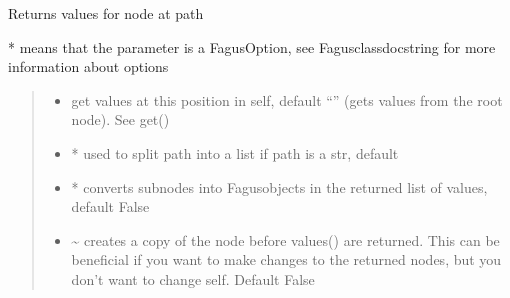 \documentclass[a4paper,10pt,english]{sphinxmanual}
\begin{document}
\begin{fulllineitems}
\begin{fulllineitems}
\begin{quote}
\begin{description}
\end{description}\end{quote}

\end{fulllineitems}


\begin{fulllineitems}
\label{\detokenize{fagus:fagus.Fagus.values}}
\pysigstartsignatures
{}
\pysigstopsignatures
\sphinxAtStartPar
Returns values for node at path

\sphinxAtStartPar
* means that the parameter is a FagusOption, see Fagus\sphinxhyphen{}class\sphinxhyphen{}docstring for more information about options
\begin{quote}\begin{description}
\begin{itemize}
\item {}
\sphinxAtStartPar
{} \textendash{} get values at this position in self, default “” (gets values from the root node). See get()

\item {}
\sphinxAtStartPar
{} \textendash{} * used to split path into a list if path is a str, default 

\item {}
\sphinxAtStartPar
{} \textendash{} * converts sub\sphinxhyphen{}nodes into Fagus\sphinxhyphen{}objects in the returned list of values, default False

\item {}
\sphinxAtStartPar
{} \textendash{} \textasciitilde{} creates a copy of the node before values() are returned. This can be beneficial if you want to make
changes to the returned nodes, but you don’t want to change self. Default False


\end{itemize}
\end{description}
\end{quote}
\end{fulllineitems}
\end{fulllineitems}
\end{document}
